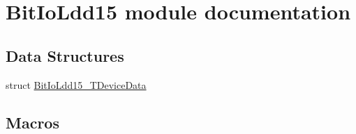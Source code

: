 \hypertarget{group___bit_io_ldd15__module}{}\section{Bit\+Io\+Ldd15 module documentation}
\label{group___bit_io_ldd15__module}
\subsection*{Data Structures}
\begin{DoxyCompactItemize}
\item 
struct \hyperlink{struct_bit_io_ldd15___t_device_data}{Bit\+Io\+Ldd15\+\_\+\+T\+Device\+Data}
\end{DoxyCompactItemize}
\subsection*{Macros}
